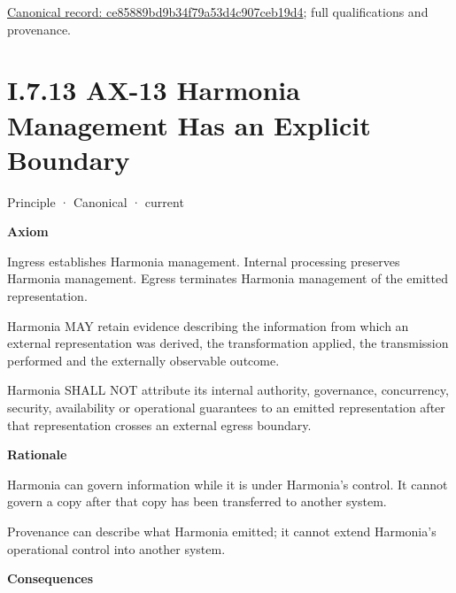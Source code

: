 {\footnotesize \href{../../../../continuum/motivation/principle/ce85889bd9b34f79a53d4c907ceb19d4.md}{Canonical record: ce85889bd9b34f79a53d4c907ceb19d4}; full qualifications and provenance.}\par
\section*{I.7.13 AX-13 Harmonia Management Has an Explicit Boundary}
\label{navigation:I.7.13}

\label{element:b6a55decfeec4f1bb3d7f18534a2ffea}
{\small Principle · Canonical · current}\par

\par\medskip\textbf{Axiom}\par


Ingress establishes Harmonia management. Internal processing preserves
Harmonia management. Egress terminates Harmonia management of the
emitted representation.



Harmonia MAY retain evidence describing the information from which an
external representation was derived, the transformation applied, the
transmission performed and the externally observable outcome.



Harmonia SHALL NOT attribute its internal authority, governance,
concurrency, security, availability or operational guarantees to an
emitted representation after that representation crosses an external
egress boundary.



\par\medskip\textbf{Rationale}\par


Harmonia can govern information while it is under Harmonia's control. It
cannot govern a copy after that copy has been transferred to another
system.



Provenance can describe what Harmonia emitted; it cannot extend
Harmonia's operational control into another system.



\par\medskip\textbf{Consequences}\par



